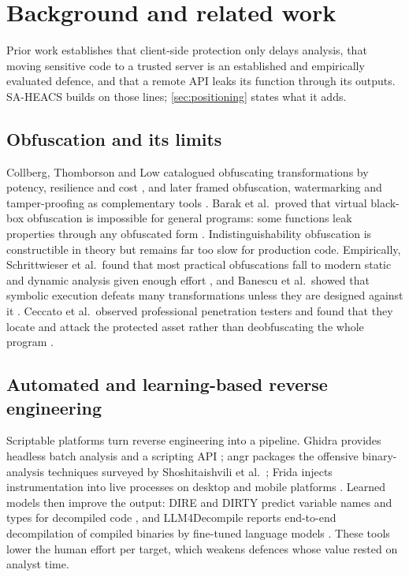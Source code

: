 \section{Background and related work}\label{sec:related}

Prior work establishes that client-side protection only delays analysis, that moving
sensitive code to a trusted server is an established and empirically evaluated defence, and
that a remote API leaks its function through its outputs. SA-HEACS builds on those lines;
\cref{sec:positioning} states what it adds.

\subsection{Obfuscation and its limits}
Collberg, Thomborson and Low catalogued obfuscating transformations by potency, resilience
and cost \cite{collberg1997taxonomy}, and later framed obfuscation, watermarking and
tamper-proofing as complementary tools \cite{collberg2002watermarking,collberg2009surreptitious}.
Barak et al.\ proved that virtual black-box obfuscation is impossible for general programs:
some functions leak properties through any obfuscated form \cite{barak2012impossibility}.
Indistinguishability obfuscation is constructible in theory \cite{garg2013candidate} but
remains far too slow for production code. Empirically, Schrittwieser et al.\ found that most
practical obfuscations fall to modern static and dynamic analysis given enough effort
\cite{schrittwieser2016obfuscation}, and Banescu et al.\ showed that symbolic execution
defeats many transformations unless they are designed against it \cite{banescu2016symbolic}.
Ceccato et al.\ observed professional penetration testers and found that they locate and
attack the protected asset rather than deobfuscating the whole program
\cite{ceccato2017hackers}.

\subsection{Automated and learning-based reverse engineering}
Scriptable platforms turn reverse engineering into a pipeline. Ghidra provides headless
batch analysis and a scripting API \cite{nsa2019ghidra}; angr packages the offensive
binary-analysis techniques surveyed by Shoshitaishvili et al.\ \cite{shoshitaishvili2016sok};
Frida injects instrumentation into live processes on desktop and mobile platforms
\cite{frida}. Learned models then improve the output: DIRE and DIRTY predict variable names
and types for decompiled code \cite{lacomis2019dire,chen2022dirty}, and LLM4Decompile reports
end-to-end decompilation of compiled binaries by fine-tuned language models
\cite{tan2024llm4decompile}. These tools lower the human effort per target, which weakens
defences whose value rested on analyst time.

